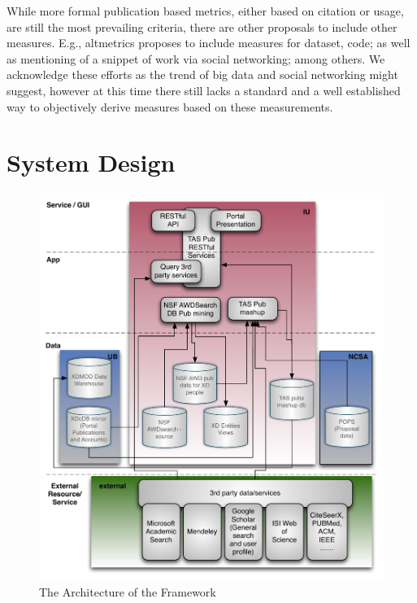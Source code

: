 \documentclass{sig-alternate}
\begin{document}
While more formal publication based metrics, either based on citation or usage, are still the most prevailing criteria, there are other proposals to include other measures. E.g., altmetrics \cite{www-altmetrics} proposes to include measures for dataset, code; as well as mentioning of a snippet of work via social networking; among others. We acknowledge these efforts as the trend of big data and social networking might suggest, however at this time there still lacks a standard and a well established way to objectively derive measures based on these measurements. 
 
 
% 
 
% 
 
\section{System Design} \label{S:design}
 
\begin{figure}[!htb] 
  \centering 
    \includegraphics[width=1.0\columnwidth]{images/tas-arch.pdf} 
  \caption{The Architecture of the Framework}\label{F:tas-arch} 
\end{figure} 
\end{document}
